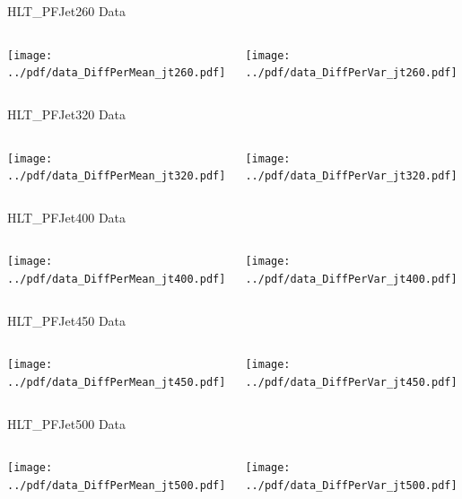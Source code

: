 \documentclass[9pt]{beamer}
\begin{document}
\begin{frame}[t]{HLT\_PFJet260 Data}
\begin{columns}[T]
  \begin{column}{.5\textwidth}
  \texttt{[image: ../pdf/data\_DiffPerMean\_jt260.pdf]}
  \end{column}
  \begin{column}{.5\textwidth}
  \texttt{[image: ../pdf/data\_DiffPerVar\_jt260.pdf]}
  \end{column}
\end{columns}
\end{frame}

\begin{frame}[t]{HLT\_PFJet320 Data}
\begin{columns}[T]
  \begin{column}{.5\textwidth}
  \texttt{[image: ../pdf/data\_DiffPerMean\_jt320.pdf]}
  \end{column}
  \begin{column}{.5\textwidth}
  \texttt{[image: ../pdf/data\_DiffPerVar\_jt320.pdf]}
  \end{column}
\end{columns}
\end{frame}

\begin{frame}[t]{HLT\_PFJet400 Data}
\begin{columns}[T]
  \begin{column}{.5\textwidth}
  \texttt{[image: ../pdf/data\_DiffPerMean\_jt400.pdf]}
  \end{column}
  \begin{column}{.5\textwidth}
  \texttt{[image: ../pdf/data\_DiffPerVar\_jt400.pdf]}
  \end{column}
\end{columns}
\end{frame}

\begin{frame}[t]{HLT\_PFJet450 Data}
\begin{columns}[T]
  \begin{column}{.5\textwidth}
  \texttt{[image: ../pdf/data\_DiffPerMean\_jt450.pdf]}
  \end{column}
  \begin{column}{.5\textwidth}
  \texttt{[image: ../pdf/data\_DiffPerVar\_jt450.pdf]}
  \end{column}
\end{columns}
\end{frame}

\begin{frame}[t]{HLT\_PFJet500 Data}
\begin{columns}[T]
  \begin{column}{.5\textwidth}
  \texttt{[image: ../pdf/data\_DiffPerMean\_jt500.pdf]}
  \end{column}
  \begin{column}{.5\textwidth}
  \texttt{[image: ../pdf/data\_DiffPerVar\_jt500.pdf]}
  \end{column}
\end{columns}
\end{frame}
\end{document}

